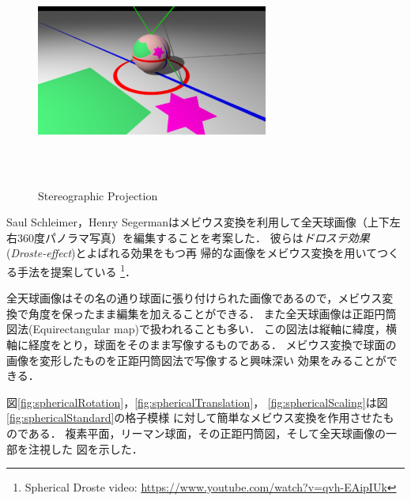 \begin{figure}[htbp]
 \center
 \includegraphics[width=3in, height=3in, keepaspectratio]{../img/klein/stereoProject.pdf}
 \caption{Stereographic Projection}
 \label{fig:stereoProject}
\end{figure}

Saul Schleimer，Henry Segermanはメビウス変換を利用して全天球画像（上下左
右360度パノラマ写真）を編集することを考案した\cite{bridges2016-15}．
彼らは\emph{ドロステ効果}(\textit{Droste-effect})とよばれる効果をもつ再
帰的な画像をメビウス変換を用いてつくる手法を提案している
\footnote{Spherical Droste video:
\url{https://www.youtube.com/watch?v=qvh-EAipIUk}}．

全天球画像はその名の通り球面に張り付けられた画像であるので，メビウス変
換で角度を保ったまま編集を加えることができる．
また全天球画像は正距円筒図法(Equirectangular map)で扱われることも多い．
この図法は縦軸に緯度，横軸に経度をとり，球面をそのまま写像するものである．
メビウス変換で球面の画像を変形したものを正距円筒図法で写像すると興味深い
効果をみることができる．

図\ref{fig:sphericalRotation}，\ref{fig:sphericalTranslation}，
\ref{fig:sphericalScaling}は図\ref{fig:sphericalStandard}の格子模様
に対して簡単なメビウス変換を作用させたものである．
複素平面，リーマン球面，その正距円筒図，そして全天球画像の一部を注視した
図を示した．


